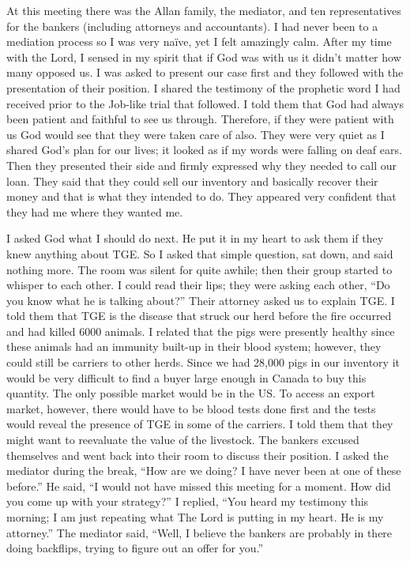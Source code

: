 \documentclass[oneside]{book}
\begin{document}
At this meeting there was the Allan family, the mediator, and ten representatives for the bankers (including attorneys and accountants). I had never been to a mediation process so I was very naïve, yet I felt amazingly calm. After my time with the Lord, I sensed in my spirit that if God was with us it didn’t matter how many opposed us. I was asked to present our case first and they followed with the presentation of their position. I shared the testimony of the prophetic word I had received prior to the Job-like trial that followed. I told them that God had always been patient and faithful to see us through. Therefore, if they were patient with us God would see that they were taken care of also. They were very quiet as I shared God's plan for our lives; it looked as if my words were falling on deaf ears. Then they presented their side and firmly expressed why they needed to call our loan. They said that they could sell our inventory and basically recover their money and that is what they intended to do. They appeared very confident that they had me where they wanted me.

I asked God what I should do next. He put it in my heart to ask them if they knew anything about TGE. So I asked that simple question, sat down, and said nothing more. The room was silent for quite awhile; then their group started to whisper to each other. I could read their lips; they were asking each other, “Do you know what he is talking about?” Their attorney asked us to explain TGE. I told them that TGE is the disease that struck our herd before the fire occurred and had killed 6000 animals. I related that the pigs were presently healthy since these animals had an immunity built-up in their blood system; however, they could still be carriers to other herds. Since we had 28,000 pigs in our inventory it would be very difficult to find a buyer large enough in Canada to buy this quantity. The only possible market would be in the US. To access an export market, however, there would have to be blood tests done first and the tests would reveal the presence of TGE in some of the carriers. I told them that they might want to reevaluate the value of the livestock. The bankers excused themselves and went back into their room to discuss their position. I asked the mediator during the break, “How are we doing? I have never been at one of these before.”  He said, “I would not have missed this meeting for a moment. How did you come up with your strategy?” I replied, “You heard my testimony this morning; I am just repeating what The Lord is putting in my heart. He is my attorney.” The mediator said, “Well, I believe the bankers are probably in there doing backflips, trying to figure out an offer for you.”
\end{document}
